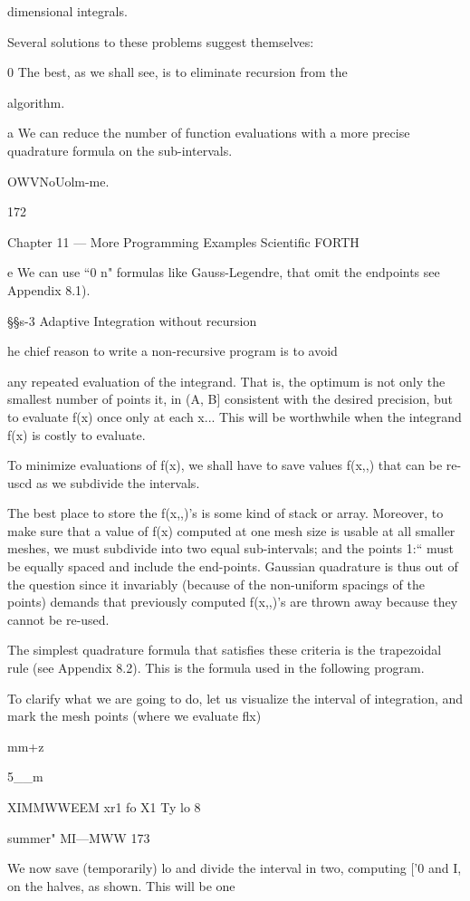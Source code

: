 dimensional integrals.

Several solutions to these problems suggest themselves:

0 The best, as we shall see, is to eliminate recursion from the

algorithm.

a We can reduce the number of function evaluations with a more
precise quadrature formula on the sub-intervals.

OWVNoUolm-me.

172

Chapter 11 — More Programming Examples Scientiﬁc FORTH

e We can use “0 n" formulas like Gauss-Legendre, that omit
the endpoints see Appendix 8.1).

§§s-3 Adaptive Integration without recursion

he chief reason to write a non-recursive program is to avoid

any repeated evaluation of the integrand. That is, the optimum
is not only the smallest number of points it, in (A, B] consistent
with the desired precision, but to evaluate f(x) once only at each
x... This will be worthwhile when the integrand f(x) is costly to
evaluate.

To minimize evaluations of f(x), we shall have to save values
f(x,,) that can be re-uscd as we subdivide the intervals.

The best place to store the f(x,,)’s is some kind of stack or array.
Moreover, to make sure that a value of f(x) computed at one
mesh size is usable at all smaller meshes, we must subdivide into
two equal sub-intervals; and the points 1:“ must be equally spaced
and include the end-points. Gaussian quadrature is thus out of
the question since it invariably (because of the non-uniform
spacings of the points) demands that previously computed f(x,,)’s
are thrown away because they cannot be re-used.

The simplest quadrature formula that satisﬁes these criteria is the
trapezoidal rule (see Appendix 8.2). This is the formula used in
the following program.

To clarify what we are going to do, let us visualize the interval of
integration, and mark the mesh points (where we evaluate ﬂx)

mm+z

5__m

XIMMWWEEM
xr1 fo
X1 Ty lo 8

summer" MI—MWW 173

We now save (temporarily) lo and divide the interval in two,
computing [’0 and I, on the halves, as shown. This will be one

